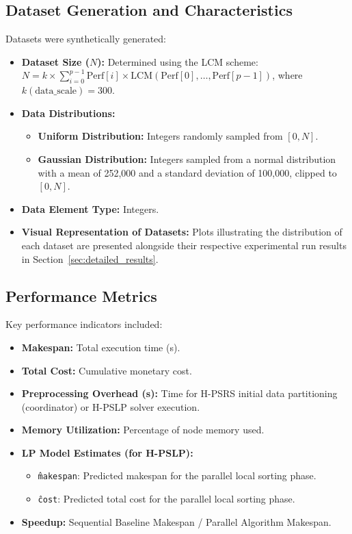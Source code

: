\documentclass[]{interact}
\theoremstyle{plain}
\theoremstyle{definition}
\theoremstyle{remark}
\begin{document}
\subsection{Dataset Generation and Characteristics}
Datasets were synthetically generated:
\begin{itemize}
    \item \textbf{Dataset Size ($N$):} Determined using the LCM scheme:
    $N = k \times \sum_{i=0}^{p-1} \text{Perf}[i] \times \text{LCM}(\text{Perf}[0], \ldots, \text{Perf}[p-1])$,
    where $k (\text{data\_scale}) = 300$.
    \item \textbf{Data Distributions:}
    \begin{itemize}
        \item \textbf{Uniform Distribution:} Integers randomly sampled from $[0, N]$.
        \item \textbf{Gaussian Distribution:} Integers sampled from a normal distribution with a mean of 252,000 and a standard deviation of 100,000, clipped to $[0, N]$.
    \end{itemize}
    \item \textbf{Data Element Type:} Integers.
    \item \textbf{Visual Representation of Datasets:} Plots illustrating the distribution of each dataset are presented alongside their respective experimental run results in Section~\ref{sec:detailed_results}.
\end{itemize}

\subsection{Performance Metrics}
Key performance indicators included:
\begin{itemize}
    \item \textbf{Makespan:} Total execution time (\textmu{}s).
    \item \textbf{Total Cost:} Cumulative monetary cost.
    \item \textbf{Preprocessing Overhead (\textmu{}s):} Time for H-PSRS initial data partitioning (coordinator) or H-PSLP solver execution.
    \item \textbf{Memory Utilization:} Percentage of node memory used.
    \item \textbf{LP Model Estimates (for H-PSLP):}
    \begin{itemize}
        \item \texttt{\^makespan}: Predicted makespan for the parallel local sorting phase.
        \item \texttt{\^cost}: Predicted total cost for the parallel local sorting phase.
    \end{itemize}
    \item \textbf{Speedup:} Sequential Baseline Makespan / Parallel Algorithm Makespan.
\end{itemize}
\end{document}
